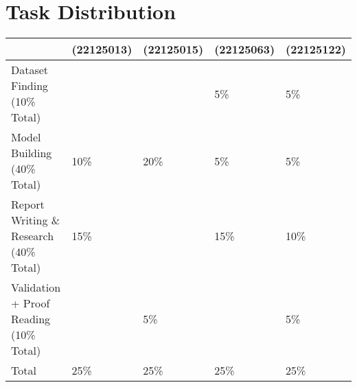\section{Task Distribution}

\begin{table}[H]
\hline
\begin{tabular}{l|llll}
\\
                                        &  (22125013) & (22125015) & (22125063) & (22125122) \\
                                        \hline
Dataset Finding (10\% Total)            & \textbf{}               &                            & 5\%                      & 5\%                         \\
Model Building (40\% Total)             & 10\%                    & 20\%                       & 5\%                      & 5\%                         \\
Report Writing \& Research (40\% Total) & 15\%                    &                            & 15\%                     & 10\%                        \\
Validation + Proof Reading (10\% Total) & \textbf{}               & 5\%                        &                          & 5\%                         \\
\hline
Total                                   & 25\%                    & 25\%   
& 25\%                     & 25\%                       
\end{tabular}
\end{table}